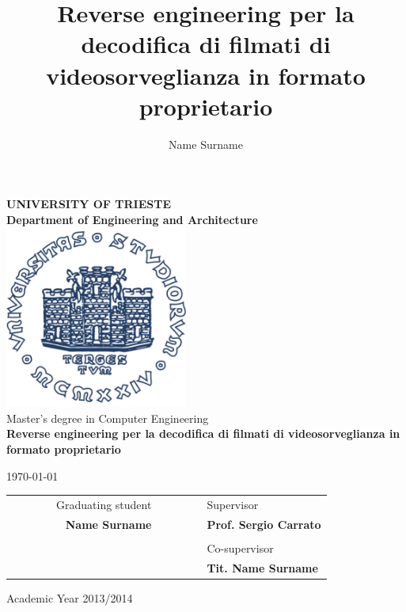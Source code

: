 \title{Reverse engineering per la decodifica di filmati di videosorveglianza in formato proprietario}
\author{Name Surname}

\begin{titlepage}
    \begin{center}
    \BgThispage
    {\LARGE {\bfseries UNIVERSITY OF TRIESTE \\}}
    \vspace{.5cm}
    {\Large {\bfseries Department of Engineering and Architecture \\}}
    \vspace{1cm}
    \includegraphics[width=6cm,height=6cm]{img/units_logo.pdf}\\[1.5cm]

    {\LARGE
        Master's degree in Computer Engineering \\
    }
    \vspace{1cm}
    {\LARGE 
        {\bfseries Reverse engineering per la decodifica di filmati di videosorveglianza in formato proprietario}
    }
    \vspace{1cm}

    {\large \today \\
    }

    \vfill
    \begin{table}[h]
        {\large
            \begin{tabular}{c c c c r c c | c c l}
                & & & & Graduating student & & & & & Supervisor \\
                & & & & \bfseries Name Surname & & & & & \bfseries Prof. Sergio Carrato \\ %
                & & & & & & & & & \\
                & & & & & & & & & Co-supervisor \\ %
                & & & & & & & & & \bfseries Tit. Name Surname \\ %
            \end{tabular}
        }
    \end{table}
    Academic Year 2013/2014
    \end{center}
\end{titlepage}
